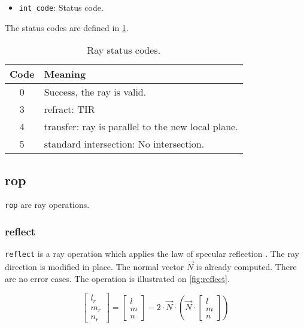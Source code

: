 \begin{itemize}
\item \lstinline{int code}: Status code.
\end{itemize}

The status codes are defined in \cref{tab:ray-status-codes}.

\begin{table} \caption{\label{tab:ray-status-codes} Ray status codes.}
\begin{tabular}{| c | l |} \hline
\textbf{Code} & \textbf{Meaning} \\ \hline
0 & Success, the ray is valid.\\ \hline
3 & refract: \gls{TIR} \\ \hline
4 & transfer: ray is parallel to the new local plane. \\ \hline
5 & standard intersection: No intersection. \\ \hline
\end{tabular} \end{table}

\subsection{rop}
\lstinline{rop} are ray operations.

\subsubsection{reflect}
\lstinline{reflect} is a ray operation which applies the law of specular
reflection \cite{wiki:specular-reflection}. The ray direction is modified in
place. The normal vector $\overrightarrow{N}$ is already computed. There are
no error cases. The operation is illustrated on \cref{fig:reflect}.

\begin{equation}
\begin{bmatrix} l_r \\ m_r \\ n_r \end{bmatrix} =
\begin{bmatrix} l \\ m \\ n \end{bmatrix} - 2 \cdot
\overrightarrow{N} \cdot \left( \overrightarrow{N} \cdot
\begin{bmatrix} l \\ m \\ n \end{bmatrix} \right)
\end{equation}

